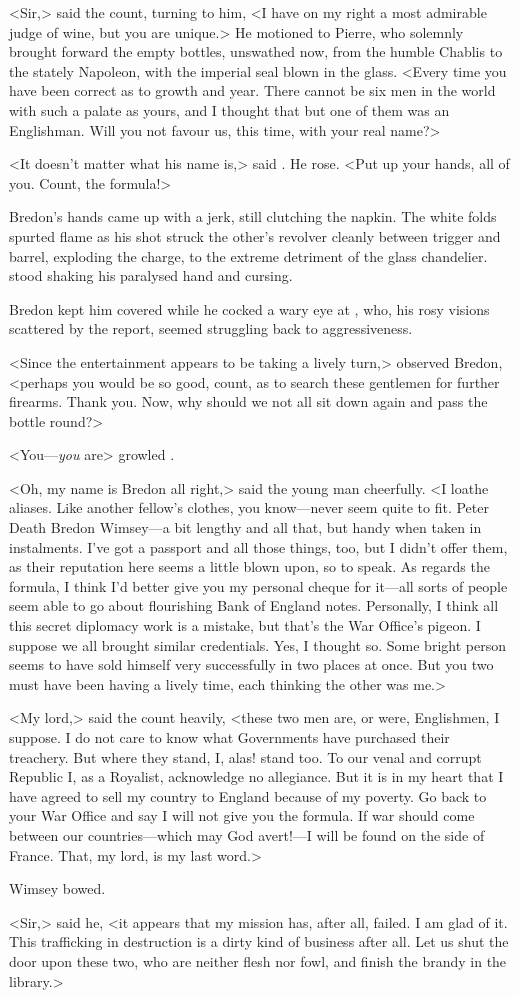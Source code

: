 <Sir,> said the count, turning to him, <I have on my right a most admirable judge of wine, but you are unique.> He motioned to Pierre, who solemnly brought forward the empty bottles, unswathed now, from the humble Chablis to the stately Napoleon, with the imperial seal blown in the glass. <Every time you have been correct as to growth and year. There cannot be six men in the world with such a palate as yours, and I thought that but one of them was an Englishman. Will you not favour us, this time, with your real name?>

<It doesn't matter what his name is,> said . He rose. <Put up your hands, all of you. Count, the formula!>

Bredon's hands came up with a jerk, still clutching the napkin. The white folds spurted flame as his shot struck the other's revolver cleanly between trigger and barrel, exploding the charge, to the extreme detriment of the glass chandelier.  stood shaking his paralysed hand and cursing.

Bredon kept him covered while he cocked a wary eye at , who, his rosy visions scattered by the report, seemed struggling back to aggressiveness.

<Since the entertainment appears to be taking a lively turn,> observed Bredon, <perhaps you would be so good, count, as to search these gentlemen for further firearms. Thank you. Now, why should we not all sit down again and pass the bottle round?>

<You—\emph{you} are\longdash> growled .

<Oh, my name is Bredon all right,> said the young man cheerfully. <I loathe aliases. Like another fellow's clothes, you know—never seem quite to fit. Peter Death Bredon Wimsey—a bit lengthy and all that, but handy when taken in instalments. I've got a passport and all those things, too, but I didn't offer them, as their reputation here seems a little blown upon, so to speak. As regards the formula, I think I'd better give you my personal cheque for it—all sorts of people seem able to go about flourishing Bank of England notes. Personally, I think all this secret diplomacy work is a mistake, but that's the War Office's pigeon. I suppose we all brought similar credentials. Yes, I thought so. Some bright person seems to have sold himself very successfully in two places at once. But you two must have been having a lively time, each thinking the other was me.>

<My lord,> said the count heavily, <these two men are, or were, Englishmen, I suppose. I do not care to know what Governments have purchased their treachery. But where they stand, I, alas! stand too. To our venal and corrupt Republic I, as a Royalist, acknowledge no allegiance. But it is in my heart that I have agreed to sell my country to England because of my poverty. Go back to your War Office and say I will not give you the formula. If war should come between our countries—which may God avert!—I will be found on the side of France. That, my lord, is my last word.>

Wimsey bowed.

<Sir,> said he, <it appears that my mission has, after all, failed. I am glad of it. This trafficking in destruction is a dirty kind of business after all. Let us shut the door upon these two, who are neither flesh nor fowl, and finish the brandy in the library.>